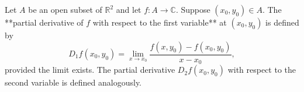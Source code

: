 Let $A$ be an open subset of $\mathbb{R}^2$ and let $f: A \to \mathbb{C}$. Suppose $(x_0, y_0) \in A$. The **partial derivative of $f$ with respect to the first variable** at $(x_0, y_0)$ is defined by
$$
D_1 f(x_0, y_0) = \lim_{x \to x_0} \frac{f(x, y_0) - f(x_0, y_0)}{x - x_0},
$$
provided the limit exists. The partial derivative $D_2 f(x_0, y_0)$ with respect to the second variable is defined analogously.
